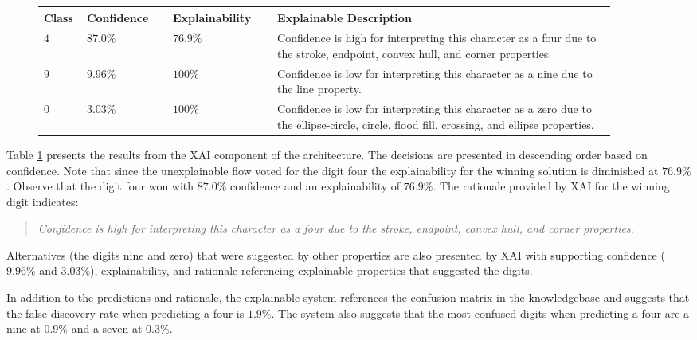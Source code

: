 \begin{figure}[H]
    \renewcommand{\arraystretch}{1.3}
     \label{table:mnist_example1_explanation}
    \begin{center}
    \begin{tabular}{| m{0.06\linewidth} | m{0.14\linewidth} | m{0.17\linewidth} | m{0.55\linewidth} |}
    \hline
     Class & Confidence & Explainability & Explainable Description \\
    \hline \hline
    $4$ & $87.0\%$ & $76.9\%$ & Confidence is high for interpreting this character as a four due to the stroke, endpoint, convex hull, and corner properties. \\ 
    \hline
    $9$ & $9.96\%$ & $100\%$ & Confidence is low for interpreting this character as a nine due to the line property. \\
    \hline
    $0$ & $3.03\%$ & $100\%$ & Confidence is low for interpreting this character as a zero due to the ellipse-circle, circle, flood fill, crossing, and ellipse properties. \\
    \hline
    \end{tabular}
    \end{center}
\end{figure}

Table \ref{table:mnist_example1_explanation} presents the results from the XAI
component of the architecture. The decisions are presented in descending order
based on confidence.  Note that since the unexplainable flow voted for the digit
four the explainability for the winning solution is diminished at $76.9\%$.
Observe that the digit four won with $87.0\%$ confidence and an explainability
of $76.9\%$.  The rationale provided by XAI for the winning digit indicates:

\begin{quote}
    \textit{Confidence is high for interpreting this character as a four due to the stroke, endpoint, convex hull, and corner properties.}
\end{quote}

Alternatives (the digits nine and zero) that were suggested by other properties
are also presented by XAI with supporting confidence ($9.96\%$ and $3.03\%$),
explainability, and rationale referencing explainable properties that suggested
the digits.

In addition to the predictions and rationale, the explainable system references
the confusion matrix in the knowledgebase and suggests that the false discovery
rate when predicting a four is $1.9\%$.  The system also suggests that the most
confused digits when predicting a four are a nine at $0.9\%$ and a seven at
$0.3\%$.

